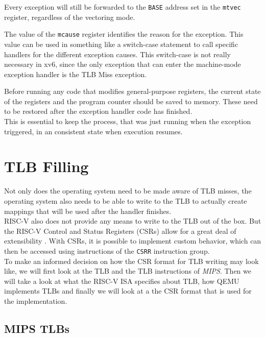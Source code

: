 Every exception will still be forwarded to the \texttt{BASE} address set in the \texttt{mtvec}
register, regardless of the vectoring mode.

The value of the \texttt{mcause} register identifies the reason for the exception.
This value can be used in something like a switch-case statement to call specific handlers
for the different exception causes.
This switch-case is not really necessary in xv6, since the only exception that can enter
the machine-mode exception handler is the TLB Miss exception.

Before running any code that modifies general-purpose registers, the current state of the
registers and the program counter should be saved to memory. These need to be restored after
the exception handler code has finished.\\
This is essential to keep the process, that was just running when the exception triggered,
in an consistent state when execution resumes.


\section{TLB Filling}
Not only does the operating system need to be made aware of TLB misses,
the operating system also needs to be able to write to the TLB to actually create
mappings that will be used after the handler finishes.\\
RISC-V also does not provide any means to write to the TLB out of the box. But the RISC-V Control and Status Registers
(CSRs) allow for a great deal of extensibility \cite{riscvreader}.
With CSRs, it is possible to implement custom behavior, which can then be accessed using instructions
of the \texttt{CSRR} instruction group.\\
To make an informed decision on how the CSR format for TLB writing may look like, we will first
look at the TLB and the TLB instructions of \emph{MIPS}. Then we will take a look at what the
RISC-V ISA specifies about TLB, how QEMU implements TLBs and finally we will look at a the
CSR format that is used for the implementation.

\subsection{MIPS TLBs}               %

